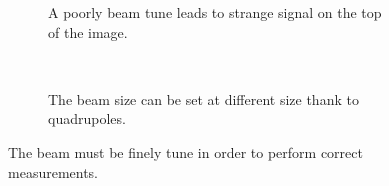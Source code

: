 \begin{figure}[!ht]
  \begin{subfigure}[t]{0.5\textwidth}
    
    \caption{A poorly beam tune leads to strange signal on the top of the image.}
    \label{chap4:beam_tuning_a}
  \end{subfigure}
  ~
  \begin{subfigure}[t]{0.5\textwidth}
    
    \caption{The beam size can be set at different size thank to quadrupoles.}
    \label{chap4:beam_tuning_b}
  \end{subfigure}
  \caption[The beam must be finely tune in order to perform correct measurements]{The beam must be finely tune in order to perform correct measurements.}
  \label{chap4:beam_tuning}
\end{figure}
